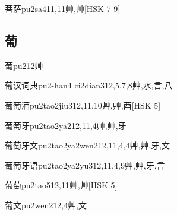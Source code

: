 \begin{EntryWithPhonetic}{菩萨}{pu2sa4}{11,11}{⾋,⾋}[HSK 7-9]
\end{EntryWithPhonetic}

\subsection*{葡}

\begin{EntryWithPhonetic}{葡}{pu2}{12}{⾋}
\end{EntryWithPhonetic}

\begin{EntryWithPhonetic}{葡汉词典}{pu2-han4 ci2dian3}{12,5,7,8}{⾋,⽔,⾔,⼋}
\end{EntryWithPhonetic}

\begin{EntryWithPhonetic}{葡萄酒}{pu2tao2jiu3}{12,11,10}{⾋,⾋,⾣}[HSK 5]
\end{EntryWithPhonetic}

\begin{EntryWithPhonetic}{葡萄牙}{pu2tao2ya2}{12,11,4}{⾋,⾋,⽛}
\end{EntryWithPhonetic}

\begin{EntryWithPhonetic}{葡萄牙文}{pu2tao2ya2wen2}{12,11,4,4}{⾋,⾋,⽛,⽂}
\end{EntryWithPhonetic}

\begin{EntryWithPhonetic}{葡萄牙语}{pu2tao2ya2yu3}{12,11,4,9}{⾋,⾋,⽛,⾔}
\end{EntryWithPhonetic}

\begin{EntryWithPhonetic}{葡萄}{pu2tao5}{12,11}{⾋,⾋}[HSK 5]
\end{EntryWithPhonetic}

\begin{EntryWithPhonetic}{葡文}{pu2wen2}{12,4}{⾋,⽂}
\end{EntryWithPhonetic}

